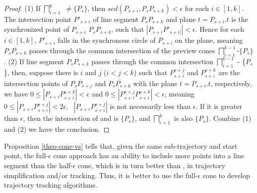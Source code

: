 \begin{proof}
(1) If $\bigsqcap_{i=1}^{k}$ $\ne \{P_s\}$, then $sed(P_{s+i}, P_sP_{s+k}) <\epsilon$ for each $i \in [1,k]$. 
The intersection point  $P'_{s+i}$ of line segment $P_s P_{s+k}$ and plane $t = P_{s+i}.t$ is the synchronized point of $P_{s+i}$ \wrt $P_s P_{s+k}$, such that $|P_{s+i}P'_{s+i]}| < \epsilon$. Hence for each $i \in [1,k]$, $P'_{s+i}$ falls in the synchronous circle of $P_{s+i}$ on the plane, meaning $\overline{P_sP_{s+k}}$ passes through the common intersection of the preview cones $\bigsqcap_{i=1}^{k-1}$-$\{P_s\}$.
%
(2) If line segment $\overline{P_sP_{s+k}}$ passes through the common intersection $\bigsqcap_{i=1}^{k-1}$ - \{$P_s$\}, then, suppose there is $i$ and $j$ ($i<j<k$) such that $P^{s+j}_{s+i}$ and $P^{s+k}_{s+i}$ are the intersection points of $\overline{P_sP_{s+j}}$ and $\overline{P_sP_{s+k}}$ with the plane $t = P_{s+i}.t$, respectively, we have $0 \le |P_{s+i}P^{s+k}_{s+i}|<\epsilon$ and $0 \le |P^{s+j}_{s+i}P^{s+k}_{s+i}|<\epsilon$, meaning $0 \le |P_{s+i}P^{s+j}_{s+i}|<2\epsilon$, \ie~$|P_{s+i}P^{s+j}_{s+i}|$ is not necessarily less than $\epsilon$. 
%
If it is greater than $\epsilon$, then the intersection of  and  is $\{P_s\}$, and $\bigsqcap_{i=1}^{k}$ is also $\{P_s\}$.
%
Combine (1) and (2) we have the conclusion.
\end{proof}

Proposition \ref{theo-cone-vs} tells that, given the same sub-trajectory and start point, the full-$\epsilon$ cone approach has an ability to include more points into a line segment than the half-$\epsilon$ cone, which is in turn better than \ldrh, in trajectory simplification and/or tracking. Thus, it is better to use the full-$\epsilon$ cone to develop trajectory tracking algorithms.

